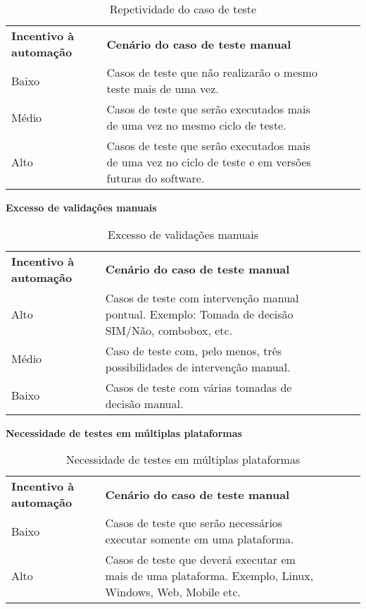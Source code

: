 \begin{table}[!ht]
\centering
\caption{Repetividade do caso de teste}
\label{my-label}
\begin{tabular}{|l|l|lll}
\cline{1-2}
\textbf{Incentivo à automação} & \textbf{Cenário do caso de teste manual}                                                                &  &  &  \\ \cline{1-2}
Baixo                          & Casos de teste que não realizarão o mesmo teste mais de uma vez.                                        &  &  &  \\ \cline{1-2}
Médio                          & Casos de teste que serão executados mais de uma vez no mesmo ciclo de teste.                            &  &  &  \\ \cline{1-2}
Alto                           & Casos de teste que serão executados mais de uma vez no ciclo de teste e em versões futuras do software. &  &  &  \\ \cline{1-2}
\end{tabular}
\end{table}

\textbf{Excesso de validações manuais}

\begin{table}[!ht]
\centering
\caption{Excesso de validações manuais}
\label{my-label}
\begin{tabular}{|l|l|lll}
\cline{1-2}
\textbf{Incentivo à automação} & \textbf{Cenário do caso de teste manual}                                                          &  &  &  \\ \cline{1-2}
Alto                           & Casos de teste com intervenção manual pontual. Exemplo: Tomada de decisão SIM/Não, combobox, etc. &  &  &  \\ \cline{1-2}
Médio                          & Caso de teste com, pelo menos, três possibilidades de intervenção manual.                         &  &  &  \\ \cline{1-2}
Baixo                          & Casos de teste com várias tomadas de decisão manual.                                              &  &  &  \\ \cline{1-2}
\end{tabular}
\end{table}


\textbf{Necessidade de testes em múltiplas plataformas}


\begin{table}[!ht]
\centering
\caption{Necessidade de testes em múltiplas plataformas}
\label{my-label}
\begin{tabular}{|l|l|lll}
\cline{1-2}
\textbf{Incentivo à automação} & \textbf{Cenário do caso de teste manual}                                                                &  &  &  \\ \cline{1-2}
Baixo                          & Casos de teste que serão necessários executar somente em uma plataforma.                                &  &  &  \\ \cline{1-2}
Alto                           & Casos de teste que deverá executar em mais de uma plataforma. Exemplo, Linux, Windows, Web, Mobile etc. &  &  \cline{1-2}
\end{tabular}
\end{table}

